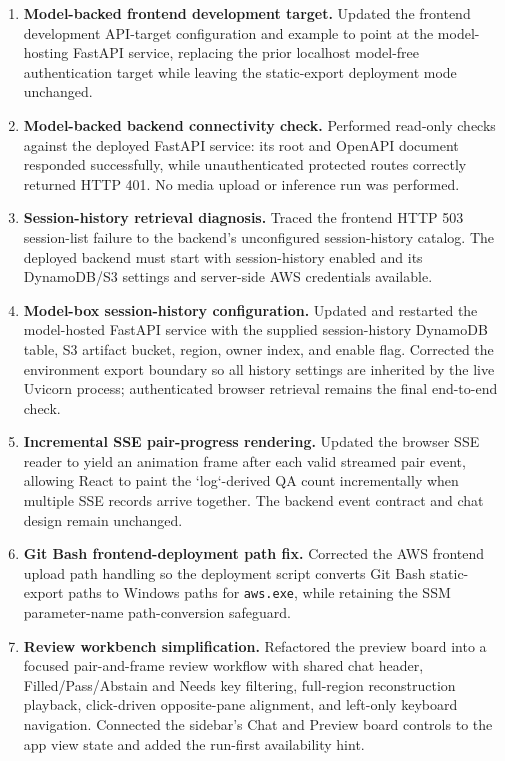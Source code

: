 \begin{enumerate}
  \item \textbf{Model-backed frontend development target.} Updated the frontend development API-target configuration and example to point at the model-hosting FastAPI service, replacing the prior localhost model-free authentication target while leaving the static-export deployment mode unchanged.

  \item \textbf{Model-backed backend connectivity check.} Performed read-only checks against the deployed FastAPI service: its root and OpenAPI document responded successfully, while unauthenticated protected routes correctly returned HTTP 401. No media upload or inference run was performed.

  \item \textbf{Session-history retrieval diagnosis.} Traced the frontend HTTP 503 session-list failure to the backend's unconfigured session-history catalog. The deployed backend must start with session-history enabled and its DynamoDB/S3 settings and server-side AWS credentials available.

  \item \textbf{Model-box session-history configuration.} Updated and restarted the model-hosted FastAPI service with the supplied session-history DynamoDB table, S3 artifact bucket, region, owner index, and enable flag. Corrected the environment export boundary so all history settings are inherited by the live Uvicorn process; authenticated browser retrieval remains the final end-to-end check.

  \item \textbf{Incremental SSE pair-progress rendering.} Updated the browser SSE reader to yield an animation frame after each valid streamed pair event, allowing React to paint the `log`-derived QA count incrementally when multiple SSE records arrive together. The backend event contract and chat design remain unchanged.

  \item \textbf{Git Bash frontend-deployment path fix.} Corrected the AWS frontend upload path handling so the deployment script converts Git Bash static-export paths to Windows paths for \texttt{aws.exe}, while retaining the SSM parameter-name path-conversion safeguard.

  \item \textbf{Review workbench simplification.} Refactored the preview board into a focused pair-and-frame review workflow with shared chat header, Filled/Pass/Abstain and Needs key filtering, full-region reconstruction playback, click-driven opposite-pane alignment, and left-only keyboard navigation. Connected the sidebar's Chat and Preview board controls to the app view state and added the run-first availability hint.


\end{enumerate}
